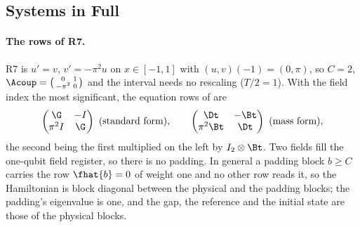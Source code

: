 %

\subsection{Systems in Full}
\label{app:systems}

\paragraph{The rows of R7.} R7 is $u'=v$, $v'=-\pi^2u$ on $x\in[-1,1]$ with $(u,v)(-1)=(0,\pi)$, so $C=2$, $\Acoup=\bigl(\begin{smallmatrix}0&1\\-\pi^2&0\end{smallmatrix}\bigr)$ and the interval needs no rescaling ($T/2=1$). With the field index the most significant, the equation rows of  are
\begin{equation}
    \begin{pmatrix}\G & -I\\ \pi^2 I & \G\end{pmatrix}\ \text{(standard form)},
    \qquad
    \begin{pmatrix}\Dt & -\Bt\\ \pi^2\Bt & \Dt\end{pmatrix}\ \text{(mass form)},
\end{equation}
the second being the first multiplied on the left by $I_2\otimes\Bt$. Two fields fill the one-qubit field register, so there is no padding. In general a padding block $b\ge C$ carries the row $\fhat{b}=0$ of weight one and no other row reads it, so the Hamiltonian is block diagonal between the physical and the padding blocks; the padding's eigenvalue is one, and the gap, the reference and the initial state are those of the physical blocks.

